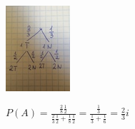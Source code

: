 \medskip
{} 
\medskip

\includegraphics{./tydzien_03/zad_10.jpg}

$P(A) = \frac{\frac{2}{8}\frac{1}{2}}{\frac{2}{3}\frac{1}{2} + \frac{1}{8}\frac{1}{2}}
 = \frac{\frac{1}{3}}{\frac{1}{3} + \frac{1}{6}} = \frac{2}{3}i$

